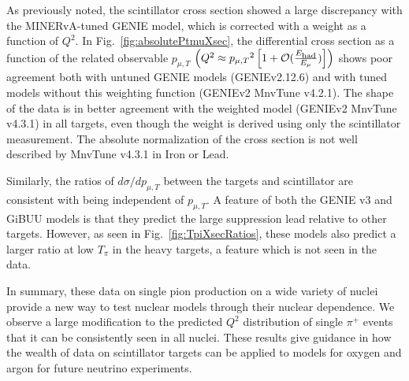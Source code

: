 \documentclass[aps,preprint,showpacs,superscriptaddress,letterpaper,showkeys,superscriptaddress,nofootinbib,floatfix]{revtex4-1}
\newcommand{\Ehad}{\ensuremath{E_{\rm\scriptstyle had}}}
\newcommand{\firstReviewStrike}[1]{{\bf\color{blue}\protect \sout{#1}}}
\newcommand{\firstRefereeAdd}[1]{{\bf\color{green} \protect #1}}
\newcommand{\firstRefereeStrike}[1]{{\bf\color{green}\protect \sout{#1}}}
\renewcommand{\firstReviewStrike}[1]{}
\renewcommand{\firstRefereeAdd}[1]{\protect #1}
\renewcommand{\firstRefereeStrike}[1]{}
\begin{document}
As previously noted, the scintillator cross section showed a large discrepancy with the MINERvA-tuned GENIE model, which is corrected with a weight as a function of $Q^2$.  In Fig.~\ref{fig:absolutePtmuXsec}, the differential cross section as a function of the related observable $p_{\mu,T}$ $\left(Q^2\approx{p_{\mu,T}}^2\left[ 1+{\cal O}(\frac{\Ehad}{E_\mu})\right] \right)$ shows poor agreement both with untuned GENIE models (GENIEv2.12.6) and with tuned models without this weighting function (GENIEv2 MnvTune v4.2.1).  The \firstRefereeAdd{shape of the} data is in better agreement with the weighted model (GENIEv2 MnvTune v4.3.1) in all targets, even though the weight is derived using only the scintillator measurement.  \firstRefereeAdd{The absolute normalization of the cross section is not well described by MnvTune v4.3.1 in Iron or Lead.}

Similarly, the ratios of $d\sigma/dp_{\mu,T}$ between the targets and scintillator are consistent with being independent of $p_{\mu,T}$.
A \firstRefereeStrike{notable} feature of both the GENIE v3 and GiBUU models is that they 
\firstReviewStrike{do appear to} predict the large suppression \firstRefereeStrike{in the} lead \firstRefereeStrike{target} relative to other targets.  However, as seen in Fig.~\ref{fig:TpiXsecRatios}, these models also predict a larger ratio at low $T_\pi$ in the heavy targets, a feature which is not seen in the data.

In summary, these data on single pion production on a wide variety of nuclei provide\firstReviewStrike{s} a new way to test nuclear models through their \firstRefereeAdd{nuclear }dependence\firstRefereeStrike{ on the size of the target nucleus}.  We observe a large modification to the predicted $Q^2$ distribution of single $\pi^+$ events \firstRefereeStrike{in scintillator, but it appears }that it can be consistently \firstRefereeStrike{applied to}\firstRefereeAdd{seen in} all nuclei.  These results \firstRefereeStrike{can} give guidance in how the \firstRefereeStrike{relative} wealth of data on scintillator targets can be applied to \firstRefereeStrike{reference} models for oxygen and argon for future neutrino experiments.
\end{document}
